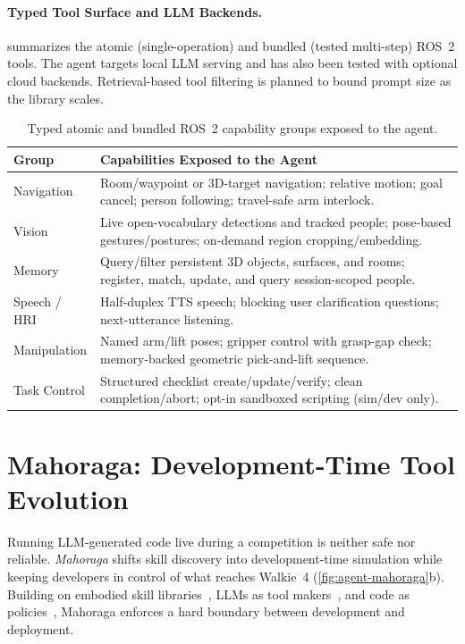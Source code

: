 \documentclass[a4paper]{llncs}
\begin{document}
\paragraph{Typed Tool Surface and LLM Backends.}
 summarizes the atomic (single-operation) and bundled (tested multi-step) ROS~2 tools. The agent targets local LLM serving
{} and has also been tested with optional cloud backends. Retrieval-based tool filtering is planned to bound prompt size as the library scales.

\begin{table}[tb]
  \centering
  \caption{Typed atomic and bundled ROS~2 capability groups exposed to the agent.}
  \label{tab:tools}
  \scriptsize
  \begin{tabularx}{\textwidth}{@{}lX@{}}
    \toprule
    \textbf{Group} & \textbf{Capabilities Exposed to the Agent} \\
    \midrule
    Navigation & Room/waypoint or 3D-target navigation; relative motion; goal cancel; person following; travel-safe arm interlock. \\
    Vision & Live open-vocabulary detections and tracked people; pose-based gestures/postures; on-demand region cropping/embedding. \\
    Memory & Query/filter persistent 3D objects, surfaces, and rooms; register, match, update, and query session-scoped people. \\
    Speech / HRI & Half-duplex TTS speech; blocking user clarification questions; next-utterance listening. \\
    Manipulation & Named arm/lift poses; gripper control with grasp-gap check; memory-backed geometric pick-and-lift sequence. \\
    Task Control & Structured checklist create/update/verify; clean completion/abort; opt-in sandboxed scripting (sim/dev only). \\
    \bottomrule
  \end{tabularx}
\end{table}

\section{Mahoraga: Development-Time Tool Evolution}
\label{sec:mahoraga}

Running LLM-generated code live during a competition is neither safe nor reliable. \emph{Mahoraga} shifts skill discovery into development-time simulation while keeping developers in control of what reaches Walkie~4 (\cref{fig:agent-mahoraga}b). Building on embodied skill libraries~\cite{wang2024voyager}, LLMs as tool makers~\cite{cai2024latm}, and code as policies~\cite{liang2023codeaspolicies}, Mahoraga enforces a hard boundary between development and deployment.
\end{document}
